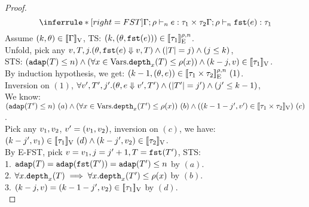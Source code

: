 \documentclass[a4paper,11pt]{article}
\theoremstyle{definition}
\begin{document}
\begin{proof}
\[
    \inferrule*[right = FST]{
      \Gamma; \dmap \tvdash{\nnatA} \expr: \type_1 \times \type_2
    }{
      \Gamma; \dmap \tvdash{\nnatA} \eprojl(\expr): \type_1
    }
\]
Assume $(k, \theta) \in [\![ \Gamma ]\!]_{\text{V}}$, TS: $(k, (\theta, \mathtt{fst}(e))) \in [\![ \tau_1 ]\!]_{\text{E}}^{\rho, n} $.\\
%
Unfold, pick any $ v, T, j. (\theta, \mathtt{fst}(e)   \mathrel{\Downarrow} v, T) \land (|T| = j) \land (j \leq k) $,\\
%
STS: $ (\mathtt{adap}(T) \leq n) \land (\forall x \in \mbox{Vars}. \mathtt{depth}_{x}(T) \leq \rho(x)) \land (k - j, v) \in [\![ \tau_1 ]\!]_{\text{V}} $.\\
%
By induction hypothesis, we get: $(k-1, (\theta, e)) \in [\![ \tau_1 \times \tau_2 ]\!]_{\text{E}}^{\rho, n} ~(1)$.\\
%
Inversion on $(1)$, $\forall v', T', j'. (\theta, e \mathrel{\Downarrow} v', T') \land (|T'| = j') \land (j' \leq k-1) $,\\
%
We know: $(\mathtt{adap}(T') \leq n) ~ (a) 
\land (\forall x \in \mbox{Vars}. \mathtt{depth}_{x}(T') \leq \rho(x)) ~ (b)
\land ((k -1 - j', v') \in [\![ \tau_1 \times \tau_2 ]\!]_{\text{V}}) ~ (c)$.\\
%
Pick any $v_1, v_2$, $v' = (v_1, v_2)$,
%
inversion on $(c)$, we have:\\
%
$(k - j', v_1) \in [\![ \tau_1 ]\!]_{\text{V}}~(d) \land (k - j', v_2) \in [\![ \tau_2 ]\!]_{\text{V}}$.\\
%
By E-FST, pick $v = v_1, j = j'+1, T = \mathtt{fst}(T')$, STS:\\
%
1. $\mathtt{adap}(T) = \mathtt{adap}(\mathtt{fst}(T')) = \mathtt{adap}(T') \leq n$ by $(a)$.\\
%
2. $\forall x .\mathtt{depth}_{x}(T) \implies \forall x . \mathtt{depth}_{x}(T') \leq \rho(x)$ by $(b)$.\\
%
3. $(k - j, v) = (k -1- j', v_2) \in
[\![ \tau_1 ]\!]_{\text{V}}$ by $(d)$.
\\





\end{proof}
\end{document}
